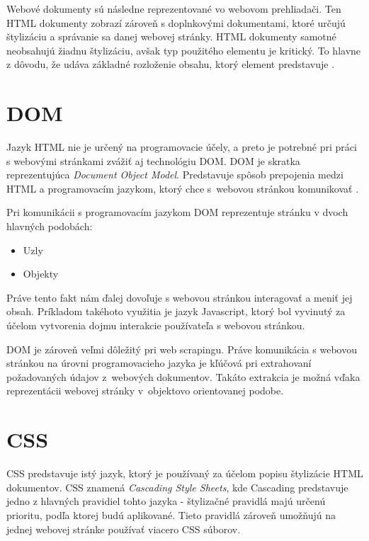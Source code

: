 Webové dokumenty sú následne reprezentované vo webovom prehliadači. Ten HTML dokumenty zobrazí zároveň s doplnkovými dokumentami, ktoré určujú štylizáciu a správanie sa danej webovej stránky. HTML dokumenty samotné neobsahujú žiadnu štylizáciu, avšak typ použitého elementu je kritický. To hlavne z dôvodu, že udáva základné rozloženie obsahu, ktorý element predstavuje \cite{WhatisHTML}.

\section{DOM}
\label{DOM}

Jazyk HTML nie je určený na programovacie účely, a preto je potrebné pri práci s webovými stránkami zvážiť aj technológiu DOM. DOM je skratka reprezentujúca \textit{Document Object Model}. Predstavuje spôsob prepojenia medzi HTML a programovacím jazykom, ktorý chce s~webovou stránkou komunikovať \cite{DOM}.

Pri komunikácii s programovacím jazykom DOM reprezentuje stránku v dvoch hlavných podobách:

\begin{itemize}
    \item {Uzly}
    \item {Objekty}
\end{itemize}

Práve tento fakt nám ďalej dovoľuje s webovou stránkou interagovať a meniť jej obsah. Príkladom takéhoto využitia je jazyk Javascript, ktorý bol vyvinutý za účelom vytvorenia dojmu interakcie používateľa s webovou stránkou. 

DOM je zároveň veľmi dôležitý pri web scrapingu. Práve komunikácia s webovou stránkou na úrovni programovacieho jazyka je kľúčová pri extrahovaní požadovaných údajov z~webových dokumentov. Takáto extrakcia je možná vďaka reprezentácii webovej stránky v~objektovo orientovanej podobe.

\section{CSS}

CSS predstavuje istý jazyk, ktorý je používaný za účelom popisu štylizácie HTML dokumentov. CSS znamená \textit{Cascading Style Sheets}, kde Cascading predstavuje jedno z hlavných pravidiel tohto jazyka - štylizačné pravidlá majú určenú prioritu, podľa ktorej budú aplikované. Tieto pravidlá zároveň umožňujú na jednej webovej stránke používať viacero CSS súborov. 

